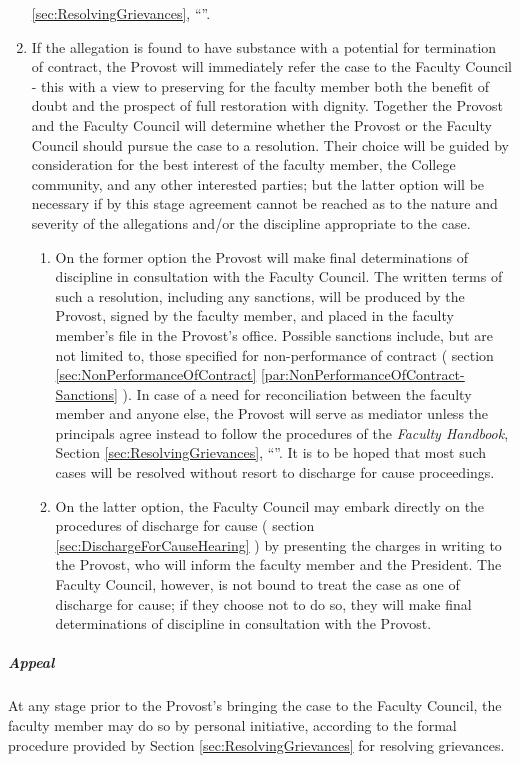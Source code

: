 \begin{enumerate}[label=\alph*)]
{							\ref{sec:ResolvingGrievances},
							``''.
						}
						\item{If the allegation is found to have substance with a potential for termination of contract, the Provost will immediately refer the case to the Faculty Council - this with a view to preserving for the faculty member both the benefit of doubt and the prospect of full restoration with dignity.  Together the Provost and the Faculty Council will determine whether the Provost or the Faculty Council should pursue the case to a resolution.  Their choice will be guided by consideration for the best interest of the faculty member, the College community, and any other interested parties; but the latter option will be necessary if by this stage agreement cannot be reached as to the nature and severity of the allegations and/or the discipline appropriate to the case.
							\begin{enumerate}[label=\arabic*)]
								\item{On the former option the Provost will make final determinations of discipline in consultation with the Faculty Council.  The written terms of such a resolution, including any sanctions, will be produced by the Provost, signed by the faculty member, and placed in the faculty member's file in the Provost's office.  Possible sanctions include, but are not limited to, those specified for non-performance of contract (
									section
									\ref{sec:NonPerformanceOfContract}
									\ref{par:NonPerformanceOfContract-Sanctions}
									).  In case of a need for reconciliation between the faculty member and anyone else, the Provost will serve as mediator unless the principals agree instead to follow the procedures of the \emph{Faculty Handbook}, Section
									\ref{sec:ResolvingGrievances},
									``''.
									It is to be hoped that most such cases will be resolved without resort to discharge for cause proceedings.}
								\item{On the latter option, the Faculty Council may embark directly on the procedures of discharge for cause (
									section
									\ref{sec:DischargeForCauseHearing}
									) by presenting the charges in writing to the Provost, who will inform the faculty member and the President.  The Faculty Council, however, is not bound to treat the case as one of discharge for cause; if they choose not to do so, they will make final determinations of discipline in consultation with the Provost.}
							\end{enumerate}
						}
					\end{enumerate}
				\subparagraph{Appeal}
					At any stage prior to the Provost's bringing the case to the Faculty Council, the faculty member may do so by personal initiative, according to the formal procedure provided by Section
					\ref{sec:ResolvingGrievances}
					for resolving grievances.
